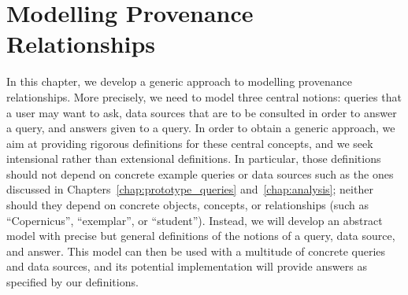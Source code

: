 \chapter{Modelling Provenance Relationships}
\label{chap:modelling}

  
In this chapter, we develop a generic approach to modelling provenance relationships.
More precisely, we need to model three central notions: queries that a user may want to ask,
data sources that are to be consulted in order to answer a query,
and answers given to a query.
In order to obtain a generic approach, we aim at providing rigorous definitions
for these central concepts, and we seek intensional rather than extensional definitions.
In particular, those definitions should not depend on concrete example queries or data sources
such as the ones discussed in Chapters~\ref{chap:prototype_queries} and~\ref{chap:analysis};
neither should they depend on concrete objects, concepts, or relationships
(such as \enquote{Copernicus}, \enquote{exemplar}, or \enquote{student}).
Instead, we will develop an abstract model with precise but general definitions
of the notions of a query, data source, and answer.
This model can then be used with a multitude of concrete queries and data sources,
and its potential implementation will provide answers as specified by our definitions.

